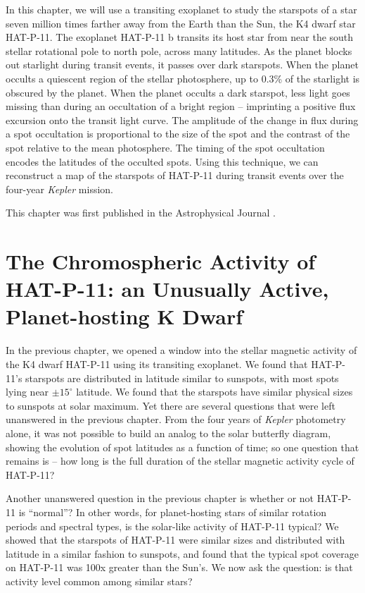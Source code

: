 \documentclass[12pt, twoside]{uwthesis}
\newcommand{\kepler}{\textsl{Kepler}\xspace}
\begin{document}
In this chapter, we will use a transiting exoplanet to study the starspots of a star seven million times farther away from the Earth than the Sun, the K4 dwarf star HAT-P-11. The exoplanet HAT-P-11 b transits its host star from near the south stellar rotational pole to north pole, across many latitudes. As the planet blocks out starlight during transit events, it passes over dark starspots. When the planet occults a quiescent region of the stellar photosphere, up to 0.3\% of the starlight is obscured by the planet. When the planet occults a dark starspot, less light goes missing than during an occultation of a bright region -- imprinting a positive flux excursion onto the transit light curve. The amplitude of the change in flux during a spot occultation is proportional to the size of the spot and the contrast of the spot relative to the mean photosphere. The timing of the spot occultation encodes the latitudes of the occulted spots. Using this technique, we can reconstruct a map of the starspots of HAT-P-11 during transit events over the four-year \kepler mission. 

This chapter was first published in the Astrophysical Journal \citep{Morris2017a}.



\chapter{The Chromospheric Activity of HAT-P-11: an Unusually Active, Planet-hosting K Dwarf} \label{chap:h11sindex}

In the previous chapter, we opened a window into the stellar magnetic activity of the K4 dwarf HAT-P-11 using its transiting exoplanet. We found that HAT-P-11's starspots are distributed in latitude similar to sunspots, with most spots lying near $\pm15^\circ$ latitude. We found that the starspots have similar physical sizes to sunspots at solar maximum. Yet there are several questions that were left unanswered in the previous chapter. From the four years of \kepler photometry alone, it was not possible to build an analog to the solar butterfly diagram, showing the evolution of spot latitudes as a function of time; so one question that remains is -- how long is the full duration of the stellar magnetic activity cycle of HAT-P-11? 

Another unanswered question in the previous chapter is whether or not HAT-P-11 is ``normal''? In other words, for  planet-hosting stars of similar rotation periods and spectral types, is the solar-like activity of HAT-P-11 typical? We showed that the starspots of HAT-P-11 were similar sizes and distributed with latitude in a similar fashion to sunspots, and found that the typical spot coverage on HAT-P-11 was 100x greater than the Sun's. We now ask the question: is that activity level common among similar stars?
\end{document}

